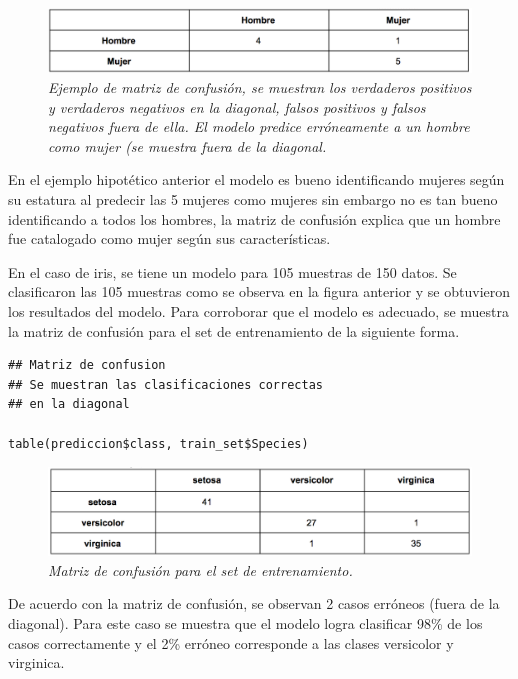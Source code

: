 \documentclass[letterpaper,12pt, spanish, oneside]{book} %
\begin{document}
\begin{figure}[H]
\centering
\includegraphics[width=1\textwidth]{fase6.png}
\caption{\label{fig:frog2}\textit{Ejemplo de matriz de confusión, se muestran los verdaderos positivos y verdaderos negativos en la diagonal, falsos positivos y falsos negativos fuera de ella. El modelo predice erróneamente a un hombre como mujer (se muestra fuera de la diagonal. }}
\end{figure}

En el ejemplo hipotético anterior el modelo es bueno identificando mujeres según su estatura al predecir las 5 mujeres como mujeres sin embargo no es tan bueno identificando a todos los hombres, la matriz de confusión explica que un hombre fue catalogado como mujer según sus características.

En el caso de iris, se tiene un modelo para 105 muestras de 150 datos. Se clasificaron las 105 muestras como se observa en la figura anterior y se obtuvieron los resultados del modelo. Para corroborar que el modelo es adecuado, se muestra la matriz de confusión para el set de entrenamiento de la siguiente forma.

\begin{lstlisting}
## Matriz de confusion
## Se muestran las clasificaciones correctas
## en la diagonal

table(prediccion$class, train_set$Species)
\end{lstlisting}

\begin{figure}[H]
\centering
\includegraphics[width=1\textwidth]{fase7.png}
\caption{\label{fig:frog2}\textit{Matriz de confusión para el set de entrenamiento.}}
\end{figure}

De acuerdo con la matriz de confusión, se observan 2 casos erróneos (fuera de la diagonal). Para este caso se muestra que el modelo logra clasificar 98\% de los casos correctamente y el 2\% erróneo corresponde a las clases versicolor y virginica. 
\end{document}
